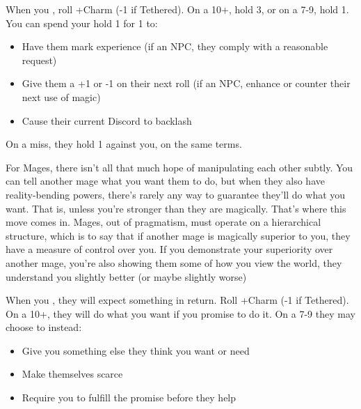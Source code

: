 



\begin{multicols}{3}

  \begin{move}
    When you , roll
    +Charm (-1 if Tethered). On a 10+, hold 3, or on a 7-9, hold
    1. You can spend your hold 1 for 1 to:
    \begin{itemize}
      \setlength\itemsep{-.5em}
    \item Have them mark experience (if an NPC, they comply with a
      reasonable request)
    \item Give them a +1 or -1 on their next roll (if an NPC, enhance
      or counter their next use of magic)
    \item Cause their current Discord to backlash
    \end{itemize}
    On a miss, they hold 1 against you, on the same terms.
\begin{movedetail}
  For Mages, there isn't all that much hope of manipulating each other
  subtly. You can tell another mage what you want them to do, but when
  they also have reality-bending powers, there's rarely any way to
  guarantee they'll do what you want. That is, unless you're stronger
  than they are magically. That's where this move comes in. Mages, out
  of pragmatism, must operate on a hierarchical structure, which is to
  say that if another mage is magically superior to you, they have a
  measure of control over you. If you demonstrate your superiority
  over another mage, you're also showing them some of how you view the
  world, they understand you slightly better (or maybe slightly worse)
\end{movedetail}
  \end{move}

  \SEPARATOR

  \begin{move}
    When you , they will expect something in
    return. Roll +Charm (-1 if Tethered). On a 10+, they will do what
    you want if you promise to do it. On a 7-9 they may choose to
    instead:
    \begin{itemize}
    \item Give you something else they think you want or need
    \item Make themselves scarce
    \item Require you to fulfill the promise before they help
    \end{itemize}
  \end{move}


\end{multicols}
